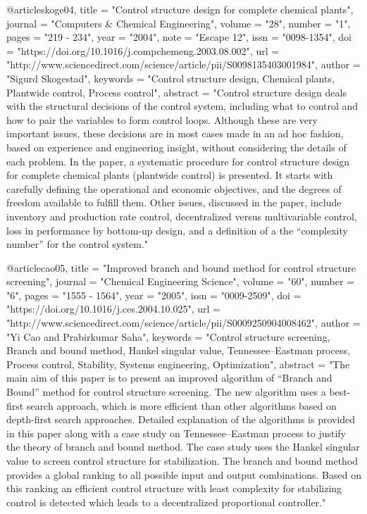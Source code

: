 @article{skoge04,
title = "Control structure design for complete chemical plants",
journal = "Computers \& Chemical Engineering",
volume = "28",
number = "1",
pages = "219 - 234",
year = "2004",
note = "Escape 12",
issn = "0098-1354",
doi = "https://doi.org/10.1016/j.compchemeng.2003.08.002",
url = "http://www.sciencedirect.com/science/article/pii/S0098135403001984",
author = "Sigurd Skogestad",
keywords = "Control structure design, Chemical plants, Plantwide control, Process control",
abstract = "Control structure design deals with the structural decisions of the control system, including what to control and how to pair the variables to form control loops. Although these are very important issues, these decisions are in most cases made in an ad hoc fashion, based on experience and engineering insight, without considering the details of each problem. In the paper, a systematic procedure for control structure design for complete chemical plants (plantwide control) is presented. It starts with carefully defining the operational and economic objectives, and the degrees of freedom available to fulfill them. Other issues, discussed in the paper, include inventory and production rate control, decentralized versus multivariable control, loss in performance by bottom-up design, and a definition of a the “complexity number” for the control system."
}

@article{cao05,
title = "Improved branch and bound method for control structure screening",
journal = "Chemical Engineering Science",
volume = "60",
number = "6",
pages = "1555 - 1564",
year = "2005",
issn = "0009-2509",
doi = "https://doi.org/10.1016/j.ces.2004.10.025",
url = "http://www.sciencedirect.com/science/article/pii/S0009250904008462",
author = "Yi Cao and Prabirkumar Saha",
keywords = "Control structure screening, Branch and bound method, Hankel singular value, Tennessee–Eastman process, Process control, Stability, Systems engineering, Optimization",
abstract = "The main aim of this paper is to present an improved algorithm of “Branch and Bound” method for control structure screening. The new algorithm uses a best-first search approach, which is more efficient than other algorithms based on depth-first search approaches. Detailed explanation of the algorithms is provided in this paper along with a case study on Tennessee–Eastman process to justify the theory of branch and bound method. The case study uses the Hankel singular value to screen control structure for stabilization. The branch and bound method provides a global ranking to all possible input and output combinations. Based on this ranking an efficient control structure with least complexity for stabilizing control is detected which leads to a decentralized proportional controller."
}


